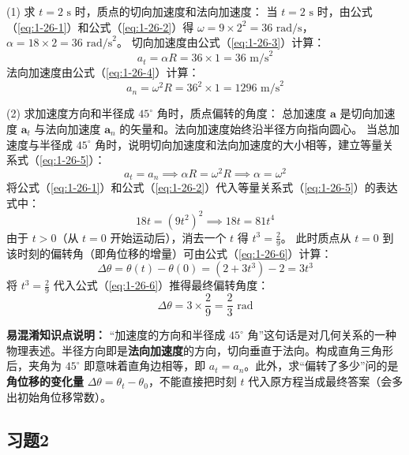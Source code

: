 (1) 求 $t = 2\text{ s}$ 时，质点的切向加速度和法向加速度：
当 $t = 2\text{ s}$ 时，由公式（\ref{eq:1-26-1}）和公式（\ref{eq:1-26-2}）得 $\omega = 9 \times 2^2 = 36 \text{ rad/s}$，$\alpha = 18 \times 2 = 36 \text{ rad/s}^2$。
切向加速度由公式（\ref{eq:1-26-3}）计算：
\begin{equation}\label{eq:1-26-3}
	a_t = \alpha R = 36 \times 1 = 36 \text{ m/s}^2
\end{equation}
法向加速度由公式（\ref{eq:1-26-4}）计算：
\begin{equation}\label{eq:1-26-4}
	a_n = \omega^2 R = 36^2 \times 1 = 1296 \text{ m/s}^2
\end{equation}

(2) 求加速度方向和半径成 $45^\circ$ 角时，质点偏转的角度：
总加速度 $\mathbf{a}$ 是切向加速度 $\mathbf{a}_t$ 与法向加速度 $\mathbf{a}_n$ 的矢量和。法向加速度始终沿半径方向指向圆心。
当总加速度与半径成 $45^\circ$ 角时，说明切向加速度和法向加速度的大小相等，建立等量关系式（\ref{eq:1-26-5}）：
\begin{equation}\label{eq:1-26-5}
	a_t = a_n \implies \alpha R = \omega^2 R \implies \alpha = \omega^2
\end{equation}
将公式（\ref{eq:1-26-1}）和公式（\ref{eq:1-26-2}）代入等量关系式（\ref{eq:1-26-5}）的表达式中：
$$ 18t = (9t^2)^2 \implies 18t = 81t^4 $$
由于 $t > 0$（从 $t=0$ 开始运动后），消去一个 $t$ 得 $t^3 = \frac{2}{9}$。
此时质点从 $t=0$ 到该时刻的偏转角（即角位移的增量）可由公式（\ref{eq:1-26-6}）计算：
\begin{equation}\label{eq:1-26-6}
	\Delta\theta = \theta(t) - \theta(0) = (2 + 3t^3) - 2 = 3t^3
\end{equation}
将 $t^3 = \frac{2}{9}$ 代入公式（\ref{eq:1-26-6}）推得最终偏转角度：
$$ \Delta\theta = 3 \times \frac{2}{9} = \frac{2}{3} \text{ rad} $$

\textbf{易混淆知识点说明：}
“加速度的方向和半径成 $45^\circ$ 角”这句话是对几何关系的一种物理表述。半径方向即是\textbf{法向加速度}的方向，切向垂直于法向。构成直角三角形后，夹角为 $45^\circ$ 即意味着直角边相等，即 $a_t = a_n$。此外，求“偏转了多少”问的是\textbf{角位移的变化量} $\Delta\theta = \theta_t - \theta_0$，不能直接把时刻 $t$ 代入原方程当成最终答案（会多出初始角位移常数）。
\newpage

\subsection{习题2}

